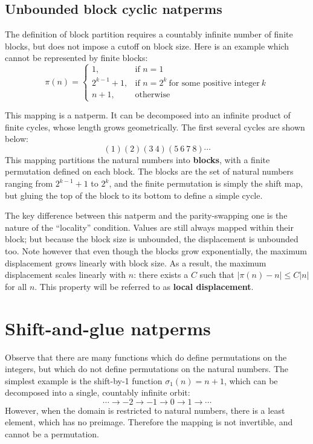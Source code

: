 \documentclass[12pt,reqno]{article}
\begin{document}
\subsection{Unbounded block cyclic natperms}

The definition of block partition requires a countably infinite number of finite blocks, but does not impose a cutoff on block size. Here is an example which cannot be represented by finite blocks:
\begin{equation}
    \pi(n) = \begin{cases}
        1, & \text{if } n = 1 \\
        2^{k-1} + 1, & \text{if } n = 2^k \ \text{for some positive integer}\ k \\
        n + 1, & \text{otherwise}
    \end{cases}
\end{equation}

This mapping is a natperm. It can be decomposed into an infinite product of finite cycles, whose length grows geometrically. The first several cycles are shown below:
$$ (1)(2)(3 \ 4)(5 \ 6 \ 7 \ 8)\cdots $$ 
This mapping partitions the natural numbers into \textbf{blocks}, with a finite permutation defined on each block. The blocks are the set of natural numbers ranging from $2^{k-1} + 1$ to $2^k$, and the finite permutation is simply the shift map, but gluing the top of the block to its bottom to define a simple cycle.

The key difference between this natperm and the parity-swapping one is the nature of the ``locality'' condition. Values are still always mapped within their block; but because the block size is unbounded, the displacement is unbounded too. Note however that even though the blocks grow exponentially, the maximum displacement grows linearly with block size. As a result, the maximum displacement scales linearly with $n$: there exists a $C$ such that $|\pi(n) - n| \leq C |n|$ for all $n$. This property will be referred to as \textbf{local displacement}.

\section{Shift-and-glue natperms}

Observe that there are many functions which do define permutations on the integers, but which do not define permutations on the natural numbers. The simplest example is the shift-by-1 function $\sigma_1(n) = n + 1$, which can be decomposed into a single, countably infinite orbit:
$$ \cdots \rightarrow -2 \rightarrow -1 \rightarrow 0 \rightarrow 1 \rightarrow \cdots $$
However, when the domain is restricted to natural numbers, there is a least element, which has no preimage. Therefore the mapping is not invertible, and cannot be a permutation.
\end{document}
